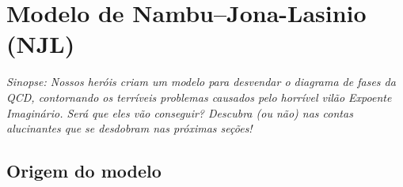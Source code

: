 \chapter{Modelo de Nambu--Jona-Lasinio (NJL)}

\begin{fullwidth}\it
Sinopse: Nossos heróis criam um modelo para desvendar o diagrama de fases da QCD, contornando os terríveis problemas causados pelo horrível vilão Expoente Imaginário. Será que eles vão conseguir? Descubra (ou não) nas contas alucinantes que se desdobram nas próximas seções!
\end{fullwidth}

\section{Origem do modelo}

